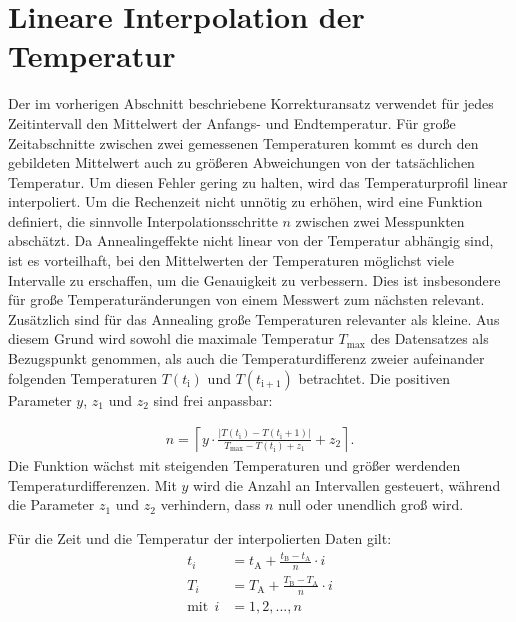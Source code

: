 \section{Lineare Interpolation der Temperatur}
Der im vorherigen Abschnitt beschriebene Korrekturansatz verwendet für jedes
Zeitintervall den Mittelwert der Anfangs- und Endtemperatur. Für große
Zeitabschnitte zwischen zwei gemessenen Temperaturen kommt es durch den gebildeten Mittelwert auch zu größeren Abweichungen von der tatsächlichen
Temperatur. Um diesen Fehler gering zu halten, wird das Temperaturprofil
linear interpoliert.
Um die Rechenzeit nicht unnötig zu erhöhen, wird eine Funktion definiert, die sinnvolle
Interpolationsschritte $n$ zwischen zwei Messpunkten abschätzt.
Da
Annealingeffekte nicht linear von
der Temperatur abhängig sind, ist es vorteilhaft,
bei den Mittelwerten der Temperaturen möglichst viele
Intervalle zu erschaffen, um die Genauigkeit zu
verbessern. Dies ist insbesondere für große Temperaturänderungen von einem Messwert zum nächsten relevant.
Zusätzlich sind für das Annealing große Temperaturen relevanter als kleine.
Aus diesem Grund wird sowohl die maximale Temperatur $T_{\mathrm{max}}$ des Datensatzes
als Bezugspunkt genommen, als auch die Temperaturdifferenz zweier
aufeinander folgenden Temperaturen $T(t_{\mathrm{i}})$ und $T(t_{\mathrm{i+1}})$  betrachtet. Die positiven Parameter $y$, $z_1$
und $z_2$ sind frei anpassbar:

\begin{align*}
  n = \left\lceil{ y \cdot \frac{|T(t_{\mathrm{i}})-T(t_{\mathrm{i}}+1)|}{T_{\mathrm{max}}-T(t_{\mathrm{i}})+ z_1}}+z_2 \right\rceil \label{eqn:intervall} .
\end{align*}
Die Funktion wächst mit steigenden Temperaturen und größer werdenden Temperaturdifferenzen.
Mit $y$ wird die Anzahl an Intervallen gesteuert, während die
Parameter $z_1$ und $z_2$ verhindern, dass $n$ null oder unendlich groß wird.


Für die Zeit und die Temperatur der interpolierten Daten gilt:
\begin{align}
  t_i &= t_{\mathrm{A}} +  \frac{t_{\mathrm{B}}-t_{\mathrm{A}}}{n} \cdot i \\
  T_i &= T_{\mathrm{A}} +  \frac{T_{\mathrm{B}}-T_{\mathrm{A}}}{n} \cdot i \\
  \text{mit}\:\:i &= 1, 2, ..., n
\end{align}

